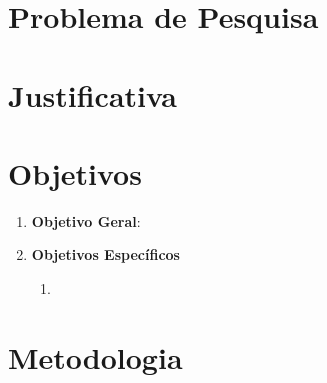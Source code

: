 \section*{Problema de Pesquisa}

\section*{Justificativa}

\section*{Objetivos}

\begin{enumerate}
	\item \textbf{Objetivo Geral}:

	\item \textbf{Objetivos Específicos}
	\begin{enumerate}
		\item 
	\end{enumerate}
\end{enumerate}

\section*{Metodologia}
